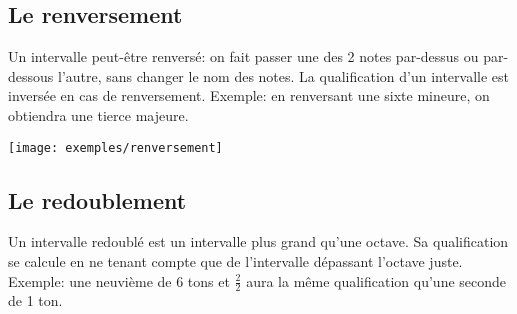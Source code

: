\documentclass[11pt,a4paper]{scrreprt}
\begin{document}
\subsection{Le renversement}
Un intervalle peut-être renversé: on fait passer une des 2 notes par-dessus ou par-dessous l'autre, sans changer le nom des notes. La qualification d'un intervalle est inversée en cas de renversement. Exemple: en renversant une sixte mineure, on obtiendra une tierce majeure.

\centerline{\texttt{[image: exemples/renversement]}}

\subsection{Le redoublement}
Un intervalle redoublé est un intervalle plus grand qu'une octave. Sa qualification se calcule en ne tenant compte que de l'intervalle dépassant l'octave juste. Exemple: une neuvième de 6 tons et $\frac2 2$ aura la même qualification qu'une seconde de 1 ton.\\
\end{document}
